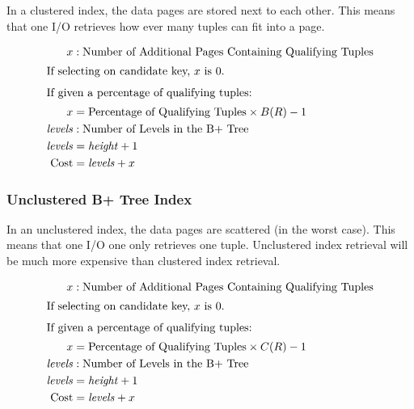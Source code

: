 \documentclass{article}
\begin{document}
In a clustered index, the data pages are stored next to each
other. This means that one I/O retrieves how ever many tuples can fit
into a page.

\begin{align}
  x &: \text{Number of Additional Pages Containing Qualifying Tuples} \notag \\
  \intertext{If selecting on candidate key, \(x\) is 0.}
  \intertext{If given a percentage of qualifying tuples:}
  x &= \text{Percentage of Qualifying Tuples} \times B(R) - 1 \\
  \mathit{levels} &: \text{Number of Levels in the B+ Tree} \notag \\
  \mathit{levels} &= \mathit{height} + 1 \\
  \text{Cost} &= \mathit{levels} + x
\end{align}

\subsubsection{Unclustered B+ Tree Index}

In an unclustered index, the data pages are scattered (in the worst
case). This means that one I/O one only retrieves one
tuple. Unclustered index retrieval will be much more expensive than
clustered index retrieval.

\begin{align}
  x &: \text{Number of Additional Pages Containing Qualifying Tuples} \notag \\
  \intertext{If selecting on candidate key, \(x\) is 0.}
  \intertext{If given a percentage of qualifying tuples:}
  x &= \text{Percentage of Qualifying Tuples} \times C(R) - 1 \\
  \mathit{levels} &: \text{Number of Levels in the B+ Tree} \notag \\
  \mathit{levels} &= \mathit{height} + 1 \\
  \text{Cost} &= \mathit{levels} + x
\end{align}
\end{document}
